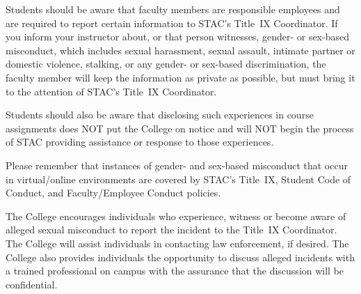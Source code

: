 \documentclass[11pt,letterpaper]{article}
\begin{document}

Students should be aware that faculty members are responsible employees and are required to report certain information to STAC’s Title~IX Coordinator. If you inform your instructor about, or that person witnesses, gender- or sex-based misconduct, which includes sexual harassment, sexual assault, intimate partner or domestic violence, stalking, or any gender- or sex-based discrimination, the faculty member will keep the information as private as possible, but must bring it to the attention of STAC's Title~IX Coordinator. \pspace

Students should also be aware that disclosing such experiences in course assignments does NOT put the College on notice and will NOT begin the process of STAC providing assistance or response to those experiences. \pspace

Please remember that instances of gender- and sex-based misconduct that occur in virtual/online environments are covered by STAC’s Title~IX, Student Code of Conduct, and Faculty/Employee Conduct policies. \pspace

The College encourages individuals who experience, witness or become aware of alleged sexual misconduct to report the incident to the Title~IX Coordinator. The College will assist individuals in contacting law enforcement, if desired. The College also provides individuals the opportunity to discuss alleged incidents with a trained professional on campus with the assurance that the discussion will be confidential. \pspace
\end{document}
